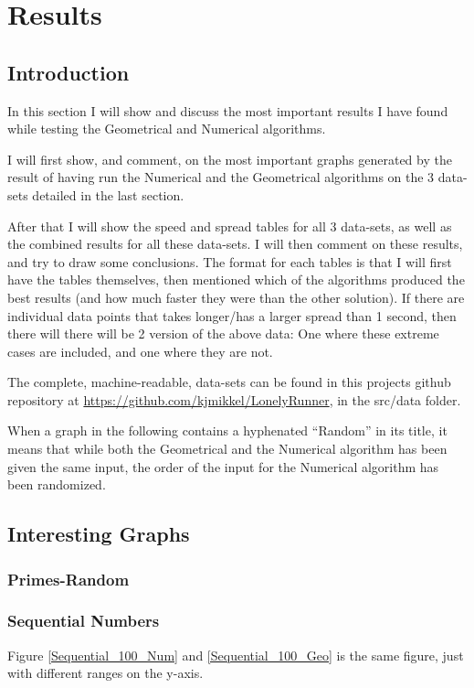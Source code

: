 \section{Results}
\label{results}
\subsection{Introduction}
In this section I will show and discuss the most important results I have found while testing the Geometrical and Numerical algorithms. 

I will first show, and comment, on the most important graphs generated by the result of having run the Numerical and the Geometrical algorithms on the 3 data-sets detailed in the last section.

After that I will show the speed and spread tables for all 3 data-sets, as well as the combined results for all these data-sets. I will then comment on these results, and try to draw some conclusions. The format for each tables is that I will first have the tables themselves, then mentioned which of the algorithms produced the best results (and how much faster they were than the other solution). If there are individual data points that takes longer/has a larger spread than 1 second, then there will there will be 2 version of the above data: One where these extreme cases are included, and one where they are not. 

The complete, machine-readable, data-sets can be found in this projects github repository at \underline{https://github.com/kjmikkel/LonelyRunner}, in the src/data folder.

When a graph in the following contains a hyphenated ``Random'' in its title, it means that while both the Geometrical and the Numerical algorithm has been given the same input, the order of the input for the Numerical algorithm has been randomized. 

\subsection{Interesting Graphs}



\subsubsection{Primes-Random}

\subsubsection{Sequential Numbers}
Figure \ref{Sequential_100_Num} and \ref{Sequential_100_Geo} is the same figure, just with different ranges on the y-axis.

